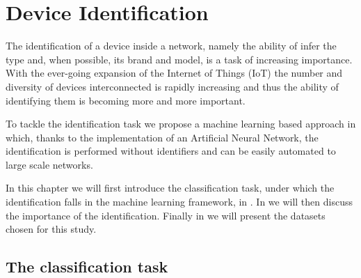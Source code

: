 \chapter{Device Identification}\label{chap3}

The identification of a device inside a network, namely the ability of infer the type
and, when possible, its brand and model, is a task of increasing importance. With the ever-going expansion of the Internet of Things (IoT)\cite{iot_2020} the number and diversity of devices interconnected is rapidly increasing and thus the ability of identifying them is becoming more and more important.

To tackle the identification task we propose a machine learning based approach in which, thanks to the implementation of an Artificial Neural Network, the identification is performed without identifiers and can be easily automated to large scale networks. 

In this chapter we will first introduce the classification task, under which the identification falls in the machine learning framework, in . In  we will then discuss the importance of the identification. Finally in  we will present the datasets chosen for this study.

\newpage
\section{The classification task}\label{classification}

